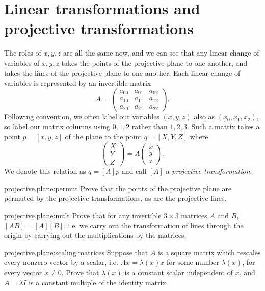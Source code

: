 \section{Linear transformations and projective transformations}
The roles of \(x,y,z\) are all the same now, and we can see that any linear change of variables of \(x,y,z\) takes the points of the projective plane to one another, and takes the lines of the projective plane to one another.
Each linear change of variables is represented by an invertible matrix
\[
A=
\begin{pmatrix}
a_{00} & a_{01} & a_{02} \\
a_{10} & a_{11} & a_{12} \\
a_{20} & a_{21} & a_{22}
\end{pmatrix}.
\]
Following convention, we often label our variables \((x,y,z)\) also as \((x_0,x_1,x_2)\), so label our matrix columns using \(0,1,2\) rather than \(1,2,3\).
Such a matrix takes a point \(p=[x,y,z]\) of the plane to the point \(q=[X,Y,Z]\) where
\[
\begin{pmatrix}
X \\
Y \\
Z
\end{pmatrix}
=
A
\begin{pmatrix}
x \\
y \\
z
\end{pmatrix}.
\]
We denote this relation as \(q=[A]p\) and call \([A]\) a \emph{projective transformation}.
\begin{problem}{projective.plane:permut}
Prove that the points of the projective plane are permuted by the projective transformations, as are the projective lines.
\end{problem}
\begin{problem}{projective.plane:mult}
Prove that for any invertible \(3 \times 3\) matrices \(A\) and \(B\), \([AB]=[A][B]\), i.e. we carry out the transformation of lines through the origin by carrying out the multiplications by the matrices.
\end{problem}
\begin{problem}{projective.plane:scaling.matrices}
Suppose that \(A\) is a square matrix which rescales every nonzero vector by a scalar, i.e. \(Ax=\lambda(x)x\) for some number \(\lambda(x)\), for every vector \(x \ne 0\). Prove that \(\lambda(x)\) is a constant scalar independent of \(x\), and \(A=\lambda I\) is a constant multiple of the identity matrix.
\end{problem}
